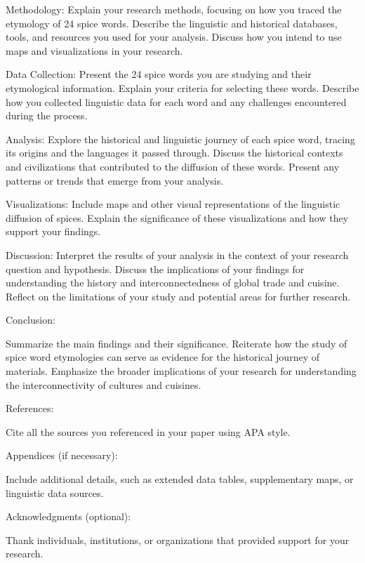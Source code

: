\documentclass[12pt]{article}
\begin{document}
    Methodology:
        Explain your research methods, focusing on how you traced the etymology of 24 spice words.
        Describe the linguistic and historical databases, tools, and resources you used for your analysis.
        Discuss how you intend to use maps and visualizations in your research.

    Data Collection:
        Present the 24 spice words you are studying and their etymological information.
        Explain your criteria for selecting these words.
        Describe how you collected linguistic data for each word and any challenges encountered during the process.

    Analysis:
        Explore the historical and linguistic journey of each spice word, tracing its origins and the languages it passed through.
        Discuss the historical contexts and civilizations that contributed to the diffusion of these words.
        Present any patterns or trends that emerge from your analysis.

    Visualizations:
        Include maps and other visual representations of the linguistic diffusion of spices. Explain the significance of these visualizations and how they support your findings.

    Discussion:
        Interpret the results of your analysis in the context of your research question and hypothesis.
        Discuss the implications of your findings for understanding the history and interconnectedness of global trade and cuisine.
        Reflect on the limitations of your study and potential areas for further research.

    Conclusion:

    Summarize the main findings and their significance.
    Reiterate how the study of spice word etymologies can serve as evidence for the historical journey of materials.
    Emphasize the broader implications of your research for understanding the interconnectivity of cultures and cuisines.

    References:

    Cite all the sources you referenced in your paper using APA style.

    Appendices (if necessary):

    Include additional details, such as extended data tables, supplementary maps, or linguistic data sources.

    Acknowledgments (optional):

    Thank individuals, institutions, or organizations that provided support for your research.
\end{document}
